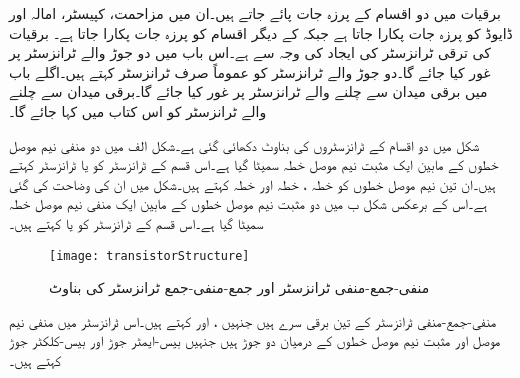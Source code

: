  
برقیات میں دو اقسام کے پرزہ جات پائے جاتے ہیں۔ان میں مزاحمت، کپیسٹر، امالہ اور ڈایوڈ کو  پرزہ جات پکارا جاتا ہے جبکہ  کے دیگر اقسام کو  پرزہ جات پکارا جاتا ہے۔
برقیات کی ترقی ٹرانزسٹر  کی ایجاد کی وجہ سے ہے۔اس باب میں  دو جوڑ والے ٹرانزسٹر  پر غور کیا جائے گا۔دو جوڑ والے ٹرانزسٹر کو عموماً صرف ٹرانزسٹر کہتے ہیں۔اگلے باب میں برقی میدان سے چلنے والے ٹرانزسٹر  پر غور کیا جائے گا۔برقی میدان سے چلنے والے ٹرانزسٹر کو اس کتاب میں  کہا جائے گا۔

شکل   میں دو اقسام کے ٹرانزسٹروں کی بناوٹ دکھائی گئی ہے۔شکل  الف   میں دو منفی نیم موصل خطوں کے مابین ایک مثبت نیم موصل خطہ سمیٹا گیا ہے۔اس قسم کے ٹرانزسٹر کو   یا  ٹرانزسٹر کہتے ہیں۔ان تین نیم موصل خطوں کو  خطہ ،  خطہ اور  خطہ  کہتے ہیں۔شکل میں ان کی وضاحت کی گئی ہے۔اس کے برعکس شکل  ب میں دو مثبت نیم موصل خطوں کے مابین ایک منفی نیم موصل خطہ سمیٹا گیا ہے۔اس قسم کے ٹرانزسٹر کو   یا   کہتے ہیں۔
\begin{figure}
\centering
\texttt{[image: transistorStructure]}
\caption{منفی-جمع-منفی ٹرانزسٹر اور جمع-منفی-جمع ٹرانزسٹر کی بناوٹ}
\label{شکل_ٹرانزسٹر_کی_بناوٹ}
\end{figure}
منفی-جمع-منفی  ٹرانزسٹر کے تین برقی سرے ہیں جنہیں  ،    اور    کہتے ہیں۔اس ٹرانزسٹر میں منفی نیم موصل   اور مثبت نیم موصل   خطوں کے درمیان دو  جوڑ ہیں جنہیں بیس-ایمٹر   جوڑ اور بیس-کلکٹر  جوڑ کہتے ہیں۔

